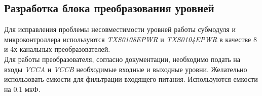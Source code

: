 \subsection{Разработка блока преобразования уровней}
Для исправления проблемы несовместимости уровней работы субмодуля и микроконтроллера используются \textit{TXS0108EPWR} и \textit{TXS0104EPWR} в качестве 8 и 4х канальных преобразователей.\\
Для работы преобразователя, согласно документации\cite{shifter_datasheet}, необходимо подать на входы \textit{VCCA} и \textit{VCCB} необходимые входные и выходные уровни. Желательно использовать емкости для фильтрации входящего питания. Используются емкости на $0.1$ мкФ.